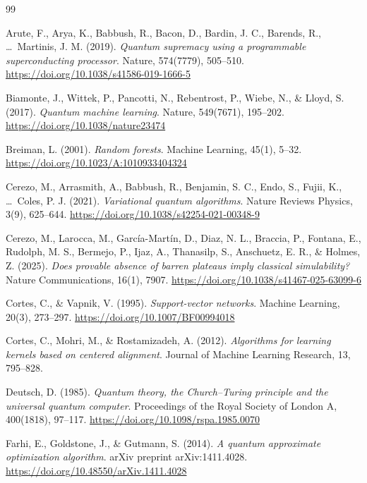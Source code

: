 \begin{thebibliography}{99}

	Arute, F., Arya, K., Babbush, R., Bacon, D., Bardin, J. C., Barends, R., \ldots\ Martinis, J. M. (2019).
	\emph{Quantum supremacy using a programmable superconducting processor}.
	Nature, 574(7779), 505--510.
	\url{https://doi.org/10.1038/s41586-019-1666-5}

	Biamonte, J., Wittek, P., Pancotti, N., Rebentrost, P., Wiebe, N., \& Lloyd, S. (2017).
	\emph{Quantum machine learning}.
	Nature, 549(7671), 195--202.
	\url{https://doi.org/10.1038/nature23474}

	Breiman, L. (2001).
	\emph{Random forests}.
	Machine Learning, 45(1), 5--32.
	\url{https://doi.org/10.1023/A:1010933404324}

	Cerezo, M., Arrasmith, A., Babbush, R., Benjamin, S. C., Endo, S., Fujii, K., \ldots\ Coles, P. J. (2021).
	\emph{Variational quantum algorithms}.
	Nature Reviews Physics, 3(9), 625--644.
	\url{https://doi.org/10.1038/s42254-021-00348-9}

	Cerezo, M., Larocca, M., Garc\'ia-Mart\'in, D., Diaz, N. L., Braccia, P., Fontana, E., Rudolph, M. S., Bermejo, P., Ijaz, A., Thanasilp, S., Anschuetz, E. R., \& Holmes, Z. (2025).
	\emph{Does provable absence of barren plateaus imply classical simulability?}
	Nature Communications, 16(1), 7907.
	\url{https://doi.org/10.1038/s41467-025-63099-6}

	Cortes, C., \& Vapnik, V. (1995).
	\emph{Support-vector networks}.
	Machine Learning, 20(3), 273--297.
	\url{https://doi.org/10.1007/BF00994018}

	Cortes, C., Mohri, M., \& Rostamizadeh, A. (2012).
	\emph{Algorithms for learning kernels based on centered alignment}.
	Journal of Machine Learning Research, 13, 795--828.

	Deutsch, D. (1985).
	\emph{Quantum theory, the Church--Turing principle and the universal quantum computer}.
	Proceedings of the Royal Society of London A, 400(1818), 97--117.
	\url{https://doi.org/10.1098/rspa.1985.0070}

	Farhi, E., Goldstone, J., \& Gutmann, S. (2014).
	\emph{A quantum approximate optimization algorithm}.
	arXiv preprint arXiv:1411.4028.
	\url{https://doi.org/10.48550/arXiv.1411.4028}


\end{thebibliography}
